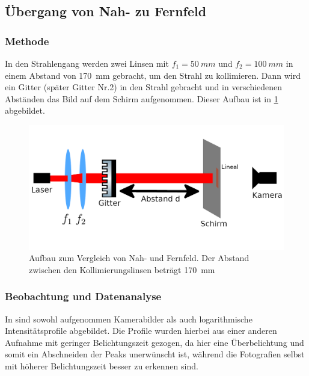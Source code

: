 \documentclass[
	a4paper,
	12pt,
	pagesize,
	ngerman
]{scrartcl}
\begin{document}
	\subsection{Übergang von Nah- zu Fernfeld}

	\subsubsection*{Methode}
	In den Strahlengang werden zwei Linsen mit $f_1=\SI{50}{mm}$ und $f_2=\SI{100}{mm}$ in einem Abstand von \SI{170}{mm} gebracht, um den Strahl zu kollimieren.
  Dann wird ein Gitter (später Gitter Nr.2) in den Strahl gebracht und in verschiedenen Abständen das Bild auf dem Schirm aufgenommen.
	Dieser Aufbau ist in \cref{fig_nahfern} abgebildet.

		\begin{figure}[H]
			\includegraphics[width=1\linewidth]{img/nahfern}
					\caption{
						Aufbau zum Vergleich von Nah- und Fernfeld. Der Abstand zwischen den Kollimierungslinsen beträgt \SI{170}{mm}
					}
					\label{fig_nahfern}
			\end{figure}


	\subsubsection*{Beobachtung und Datenanalyse}
	In  sind sowohl aufgenommen Kamerabilder als auch logarithmische Intensitätsprofile abgebildet.
	Die Profile wurden hierbei aus einer anderen Aufnahme mit geringer Belichtungszeit gezogen, da hier eine Überbelichtung und somit ein Abschneiden der Peaks unerwünscht ist, während die Fotografien selbst mit höherer Belichtungszeit besser zu erkennen sind.
\end{document}
